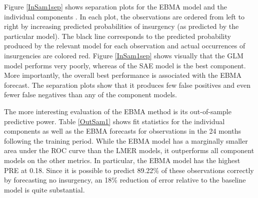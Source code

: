 \documentclass[pdftex,12pt,fullpage,oneside]{amsart}
\begin{document}
Figure \ref{InSam1sep} shows separation plots for the EBMA model and
the individual components \citep{Greenhill:2011}. In each plot, the
observations are ordered from left to right by increasing predicted
probabilities of insurgency (as predicted by the particular
model). The black line corresponds to the predicted probability
produced by the relevant model for each observation and actual
occurrences of insurgencies are colored red.  Figure \ref{InSam1sep}
shows visually that the GLM model performs very poorly, whereas of the
SAE model is the best component.  More importantly, the overall best
performance is associated with the EBMA forecast. The separation plots
show that it produces few false positives and even fewer
false negatives than any of the component models.

The more interesting evaluation of the EBMA method is its
out-of-sample predictive power. Table \ref{OutSam1} shows fit
statistics for the individual components as well as the EBMA forecasts
for observations in the 24 months following the training period.
While the EBMA model has a marginally smaller area under the ROC curve
than the LMER models, it outperforms all component models on the other
metrics. In particular, the EBMA model has the highest PRE at 0.18.
Since it is possible to predict 89.22\% of these observations
correctly by forecasting no insurgency, an 18\% reduction of error
relative to the baseline model is quite substantial.




\end{document}

